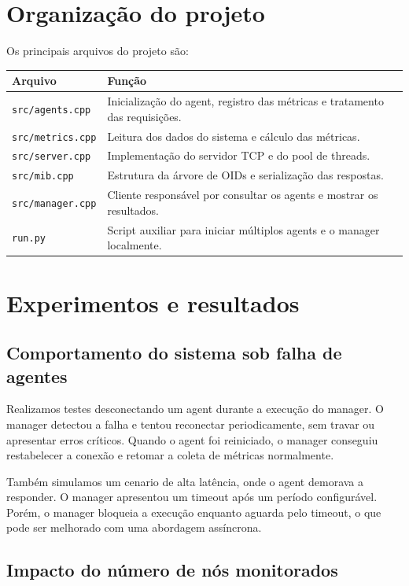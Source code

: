 \documentclass[12pt,a4paper]{article}
\begin{document}
\section{Organização do projeto}
Os principais arquivos do projeto são:
\begin{longtable}{p{}p{}}
\toprule
Arquivo & Função \\
\midrule
\endhead
\texttt{src/agents.cpp} & Inicialização do agent, registro das métricas e tratamento das requisições. \\
\texttt{src/metrics.cpp} & Leitura dos dados do sistema e cálculo das métricas. \\
\texttt{src/server.cpp} & Implementação do servidor TCP e do pool de threads. \\
\texttt{src/mib.cpp} & Estrutura da árvore de OIDs e serialização das respostas. \\
\texttt{src/manager.cpp} & Cliente responsável por consultar os agents e mostrar os resultados. \\
\texttt{run.py} & Script auxiliar para iniciar múltiplos agents e o manager localmente. \\
\bottomrule
\end{longtable}

\section{Experimentos e resultados}

\subsection{Comportamento do sistema sob falha de agentes}
Realizamos testes desconectando um agent durante a execução do manager. O manager detectou a falha e tentou reconectar periodicamente, sem travar ou apresentar erros críticos. Quando o agent foi reiniciado, o manager conseguiu restabelecer a conexão e retomar a coleta de métricas normalmente.

Também simulamos um cenario de alta latência, onde o agent demorava a responder. O manager apresentou um timeout após um período configurável. Porém, o manager bloqueia a execução enquanto aguarda pelo timeout, o que pode ser melhorado com uma abordagem assíncrona.

\subsection{Impacto do número de nós monitorados}
\end{document}
